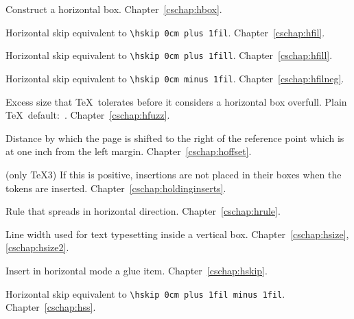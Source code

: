\begin{glossinventory}
\item [\cs{hbox\gr{box specification}\lb\gr{horizontal material}\rb}]
      Construct a horizontal box. 
Chapter~\ref{cschap:hbox}.

\item [\cs{hfil}]
      Horizontal skip equivalent to \verb-\hskip 0cm plus 1fil-.
Chapter~\ref{cschap:hfil}.

\item [\cs{hfill}]
      Horizontal skip equivalent to \verb-\hskip 0cm plus 1fill-.
Chapter~\ref{cschap:hfill}.

\item [\cs{hfilneg}]
      Horizontal skip equivalent to \verb-\hskip 0cm minus 1fil-.
Chapter~\ref{cschap:hfilneg}.

\item [\cs{hfuzz}]
      Excess size that \TeX\ tolerates before it considers  
      a horizontal box overfull.
      Plain \TeX\ default:~\n{0.1pt}.
Chapter~\ref{cschap:hfuzz}.

\item [\cs{hoffset}]
      Distance by which the page is shifted to the right 
      of the reference point which is at one inch from
      the left margin.
Chapter~\ref{cschap:hoffset}.

\item [\cs{holdinginserts}]
      (only \TeX3) 
      If this is positive, insertions are not placed in their boxes 
      when the  tokens are inserted.
Chapter~\ref{cschap:holdinginserts}.

\item [\cs{hrule}]
      Rule that spreads in horizontal direction.
Chapter~\ref{cschap:hrule}.

\item [\cs{hsize}]
      Line width used for text typesetting inside a vertical box.
Chapter~\ref{cschap:hsize},\ref{cschap:hsize2}.

\item [\cs{hskip\gr{glue}}] 
      Insert in horizontal mode a glue item.
Chapter~\ref{cschap:hskip}.

\item [\cs{hss}]
      Horizontal skip equivalent to \verb-\hskip 0cm plus 1fil minus 1fil-.
Chapter~\ref{cschap:hss}.


\end{glossinventory}
